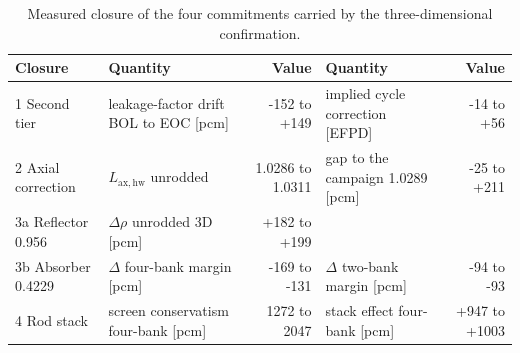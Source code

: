 \begin{table}[htbp]
  \centering
  \caption[Closures of the three-dimensional confirmation]{Measured closure of the four commitments carried by the three-dimensional confirmation.}
  \label{tab:c8-closures}
  \begin{tabular}{@{}l l r l r@{}}
    \toprule
    Closure & Quantity & Value & Quantity & Value \\
    \midrule
    1 Second tier & leakage-factor drift BOL to EOC [pcm] & -152 to +149 & implied cycle correction [EFPD] & -14 to +56 \\
    2 Axial correction & $L_\mathrm{ax,hw}$ unrodded & 1.0286 to 1.0311 & gap to the campaign 1.0289 [pcm] & -25 to +211 \\
    3a Reflector 0.956 & $\Delta\rho$ unrodded 3D [pcm] & +182 to +199 &  &  \\
    3b Absorber 0.4229 & $\Delta$ four-bank margin [pcm] & -169 to -131 & $\Delta$ two-bank margin [pcm] & -94 to -93 \\
    4 Rod stack & screen conservatism four-bank [pcm] & 1272 to 2047 & stack effect four-bank [pcm] & +947 to +1003 \\
    \bottomrule
  \end{tabular}
\end{table}
